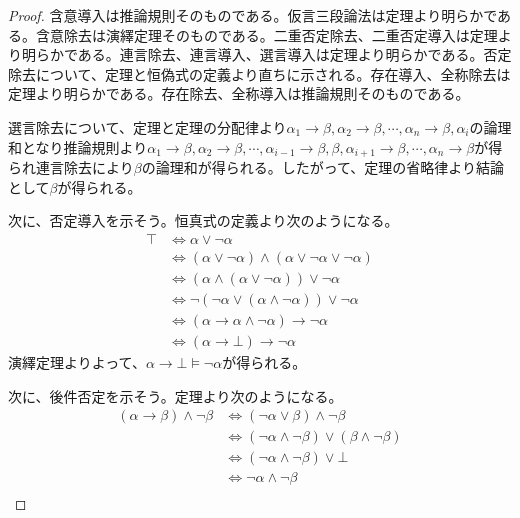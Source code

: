 \documentclass[a4paper]{jsarticle}
\begin{document}
\begin{proof}
含意導入は推論規則そのものである。仮言三段論法は定理より明らかである。含意除去は演繹定理そのものである。二重否定除去、二重否定導入は定理より明らかである。連言除去、連言導入、選言導入は定理より明らかである。否定除去について、定理と恒偽式の定義より直ちに示される。存在導入、全称除去は定理より明らかである。存在除去、全称導入は推論規則そのものである。\par
選言除去について、定理と定理の分配律より$\alpha_{1} \rightarrow \beta,\alpha_{2} \rightarrow \beta,\cdots,\alpha_{n} \rightarrow \beta,\alpha_{i}$の論理和となり推論規則より$\alpha_{1} \rightarrow \beta,\alpha_{2} \rightarrow \beta,\cdots,\alpha_{i - 1} \rightarrow \beta,\beta,\alpha_{i + 1} \rightarrow \beta,\cdots,\alpha_{n} \rightarrow \beta$が得られ連言除去により$\beta$の論理和が得られる。したがって、定理の省略律より結論として$\beta$が得られる。\par
次に、否定導入を示そう。恒真式の定義より次のようになる。
\begin{align*}
\top &\Leftrightarrow \alpha \vee \neg\alpha \\
&\Leftrightarrow (\alpha \vee \neg\alpha) \land (\alpha \vee \neg\alpha \vee \neg\alpha) \\
&\Leftrightarrow \left( \alpha \land (\alpha \vee \neg\alpha) \right) \vee \neg\alpha \\ 
&\Leftrightarrow \neg\left( \neg\alpha \vee (\alpha \land \neg\alpha) \right) \vee \neg\alpha \\
&\Leftrightarrow (\alpha \rightarrow \alpha \land \neg\alpha) \rightarrow \neg\alpha \\
&\Leftrightarrow (\alpha \rightarrow \bot) \rightarrow \neg\alpha
\end{align*}
演繹定理よりよって、$\alpha \rightarrow \bot \vDash \neg\alpha$が得られる。\par
次に、後件否定を示そう。定理より次のようになる。
\begin{align*}
(\alpha \rightarrow \beta) \land \neg\beta &\Leftrightarrow (\neg\alpha \vee \beta) \land \neg\beta \\
&\Leftrightarrow (\neg\alpha \land \neg\beta) \vee (\beta \land \neg\beta) \\
&\Leftrightarrow (\neg\alpha \land \neg\beta) \vee \bot \\ 
&\Leftrightarrow \neg\alpha \land \neg\beta \\ 

\end{align*}
\end{proof}
\end{document}
